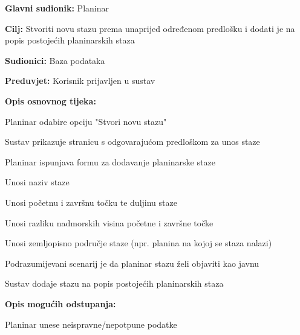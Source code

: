 			\noindent {}
		\begin{packed_item}
			
			\item \textbf{Glavni sudionik: }$ $Planinar$ $
			\item  \textbf{Cilj:} $ $Stvoriti novu stazu prema unaprijed određenom predlošku i dodati je na popis postojećih planinarskih staza$ $
			\item  \textbf{Sudionici:} $ $Baza podataka$ $
			\item  \textbf{Preduvjet:} $ $Korisnik prijavljen u sustav$ $
			\item  \textbf{Opis osnovnog tijeka:}
			
			\item[] \begin{packed_enum}
				
				\item $ $Planinar odabire opciju "Stvori novu stazu"$ $
				\item $ $Sustav prikazuje stranicu s odgovarajućom predloškom za unos staze$ $
				\item $ $Planinar ispunjava formu za dodavanje planinarske staze$ $
					\begin{packed_enum}
						\item Unosi naziv staze
						\item Unosi početnu i završnu točku te duljinu staze
						\item Unosi razliku nadmorskih visina početne i završne točke
						\item Unosi zemljopisno područje staze (npr. planina na kojoj se staza nalazi)
						\item Podrazumijevani scenarij je da planinar stazu želi objaviti kao javnu
					\end{packed_enum}	
				\item $ $Sustav dodaje stazu na popis postojećih planinarskih staza$ $
			\end{packed_enum}
		\item  \textbf{Opis mogućih odstupanja:}
		
		\item[] \begin{packed_item}
			
			\item[3.a] $ $Planinar unese neispravne/nepotpune podatke$ $
			\item[] \begin{packed_enum}
				

\end{packed_enum}
\end{packed_item}
\end{packed_item}
